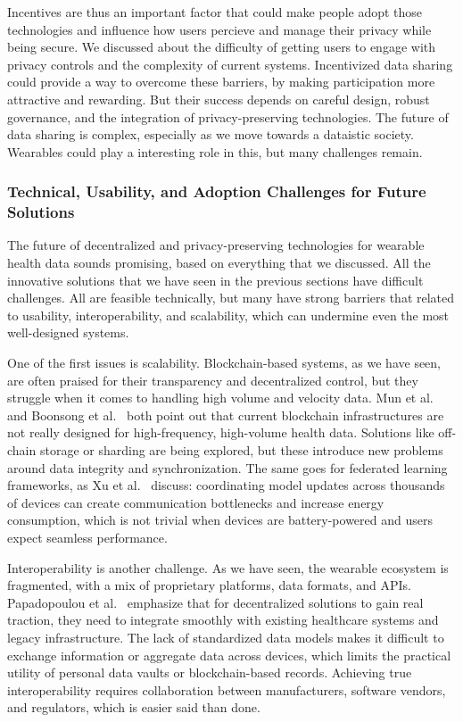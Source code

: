 	Incentives are thus an important factor that could make people adopt those technologies and influence how users percieve and manage their privacy while being secure. We discussed about the difficulty of getting users to engage with privacy controls and the complexity of current systems. Incentivized data sharing could provide a way to overcome these barriers, by making participation more attractive and rewarding. 
	But their success depends on careful design, robust governance, and the integration of privacy-preserving technologies. The future of data sharing is complex, especially as we move towards a dataistic society. Wearables could play a interesting role in this, but many challenges remain.
	\subsubsection{Technical, Usability, and Adoption Challenges for Future Solutions}

	The future of decentralized and privacy-preserving technologies for wearable health data sounds promising, based on everything that we discussed. All the innovative solutions that we have seen in the previous sections have difficult challenges. All are feasible technically, but many have strong barriers that related to usability, interoperability, and scalability, which can undermine even the most well-designed systems.

	One of the first issues is scalability. Blockchain-based systems, as we have seen, are often praised for their transparency and decentralized control, but they struggle when it comes to handling high volume and velocity data. Mun et al.~\cite{Mun2010} and Boonsong et al.~\cite{Boonsong2024} both point out that current blockchain infrastructures are not really designed for high-frequency, high-volume health data. Solutions like off-chain storage or sharding are being explored, but these introduce new problems around data integrity and synchronization. The same goes for federated learning frameworks, as Xu et al.~\cite{Xu2021} discuss: coordinating model updates across thousands of devices can create communication bottlenecks and increase energy consumption, which is not trivial when devices are battery-powered and users expect seamless performance.

	Interoperability is another challenge. As we have seen, the wearable ecosystem is fragmented, with a mix of proprietary platforms, data formats, and APIs. Papadopoulou et al.~\cite{Papadopoulou2015} emphasize that for decentralized solutions to gain real traction, they need to integrate smoothly with existing healthcare systems and legacy infrastructure. The lack of standardized data models makes it difficult to exchange information or aggregate data across devices, which limits the practical utility of personal data vaults or blockchain-based records. Achieving true interoperability requires collaboration between manufacturers, software vendors, and regulators, which is easier said than done.

